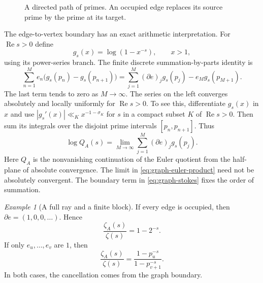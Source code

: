 \documentclass[12pt,letterpaper]{article}
\theoremstyle{definition}
\theoremstyle{remark}
\newtheorem{example}[theorem]{Example}
\numberwithin{equation}{section}
\newcommand{\Ree}{\operatorname{Re}}
\begin{document}
\begin{figure}[htbp]
\centering
{}
\caption{A directed path of primes.  An occupied edge replaces its
source prime by the prime at its target.}
\label{fig:prime-path}
\end{figure}

The edge-to-vertex boundary has an exact arithmetic interpretation.
For $\Ree s>0$ define
\[
 g_s(x)=\log(1-x^{-s}),\qquad x>1,
\]
using its power-series branch.  The finite discrete summation-by-parts
identity is
\begin{equation}\label{eq:graph-stokes}
 \sum_{n=1}^{M}e_n\bigl(g_s(p_n)-g_s(p_{n+1})\bigr)
 =\sum_{j=1}^{M}(\partial e)_jg_s(p_j)-e_Mg_s(p_{M+1}).
\end{equation}
The last term tends to zero as $M\to\infty$.
The series on the left converges absolutely and locally uniformly for
$\Ree s>0$.  To see this, differentiate $g_s(x)$ in $x$ and use
$|g_s'(x)|\ll_K x^{-1-\sigma_K}$ for $s$ in a compact subset $K$ of
$\Ree s>0$.  Then sum its integrals over the disjoint prime intervals
$[p_n,p_{n+1}]$.  Thus
\begin{equation}\label{eq:graph-euler-product}
 \boxed{\log Q_A(s)
 =\lim_{M\to\infty}\sum_{j=1}^{M}(\partial e)_jg_s(p_j).}
\end{equation}
Here $Q_A$ is the nonvanishing continuation of the Euler quotient
from the half-plane of absolute convergence.
The limit in \eqref{eq:graph-euler-product} need not be absolutely
convergent.  The boundary term in \eqref{eq:graph-stokes} fixes the
order of summation.

\begin{example}[A full ray and a finite block]
If every edge is occupied, then
$\partial e=(1,0,0,\ldots)$.  Hence
\[
  \frac{\zeta_A(s)}{\zeta(s)}=1-2^{-s}.
\]
If only $e_u,\ldots,e_v$ are $1$, then
\[
 \frac{\zeta_A(s)}{\zeta(s)}
 =\frac{1-p_u^{-s}}{1-p_{v+1}^{-s}}.
\]
In both cases, the cancellation comes from the graph boundary.
\end{example}
\end{document}
